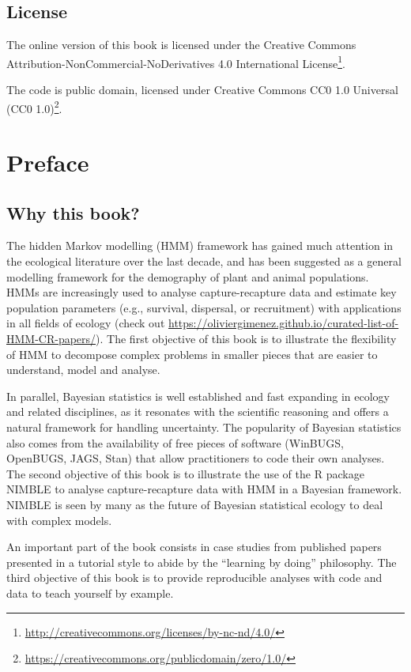 \documentclass[
  12pt,
]{krantz}
\renewcommand{\href}[2]{#2\footnote{\url{#1}}}
\begin{document}
\section*{License}\label{license}


The online version of this book is licensed under the \href{http://creativecommons.org/licenses/by-nc-nd/4.0/}{Creative Commons Attribution-NonCommercial-NoDerivatives 4.0 International License}.

The code is public domain, licensed under \href{https://creativecommons.org/publicdomain/zero/1.0/}{Creative Commons CC0 1.0 Universal (CC0 1.0)}.

\chapter*{Preface}\label{preface}


\section*{Why this book?}\label{why-this-book}


The hidden Markov modelling (HMM) framework has gained much attention in the ecological literature over the last decade, and has been suggested as a general modelling framework for the demography of plant and animal populations. HMMs are increasingly used to analyse capture-recapture data and estimate key population parameters (e.g., survival, dispersal, or recruitment) with applications in all fields of ecology (check out \url{https://oliviergimenez.github.io/curated-list-of-HMM-CR-papers/}). The first objective of this book is to illustrate the flexibility of HMM to decompose complex problems in smaller pieces that are easier to understand, model and analyse.

In parallel, Bayesian statistics is well established and fast expanding in ecology and related disciplines, as it resonates with the scientific reasoning and offers a natural framework for handling uncertainty. The popularity of Bayesian statistics also comes from the availability of free pieces of software (WinBUGS, OpenBUGS, JAGS, Stan) that allow practitioners to code their own analyses. The second objective of this book is to illustrate the use of the R package NIMBLE \citep{deValpine2017} to analyse capture-recapture data with HMM in a Bayesian framework. NIMBLE is seen by many as the future of Bayesian statistical ecology to deal with complex models.

An important part of the book consists in case studies from published papers presented in a tutorial style to abide by the ``learning by doing'' philosophy. The third objective of this book is to provide reproducible analyses with code and data to teach yourself by example.
\end{document}
